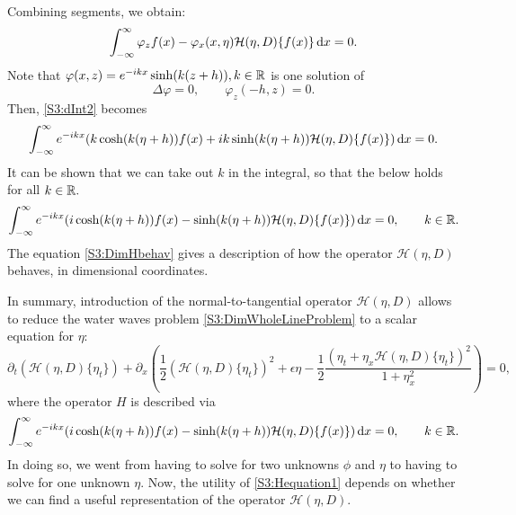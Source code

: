 \documentclass[11pt,reqno,oneside,a4paper]{article}
\begin{document}
Combining segments, we obtain: 
\begin{equation}\label{S3:dInt2}
\int_{-\infty}^{\infty} \varphi_z f(x) -\varphi_x(x, \eta) \mathcal{H}( \eta, D)\{ f(x) \} \,\mathrm{d} x = 0.
\end{equation}
Note that $\varphi(x,z) = e^{-ikx} \sinh(k(z+h)), k \in \mathbb R$ is one solution of 
\[ \Delta \varphi = 0, \qquad \varphi_z(-h,z) = 0.\]
Then, \eqref{S3:dInt2} becomes
\begin{align*}
\int_{-\infty}^{\infty} e^{-ikx}( k \cosh(k(\eta+h)) f(x) + ik \sinh(k(\eta+h)) \mathcal{H}( \eta, D)\{ f(x) \}) \,\mathrm{d} x = 0.
\end{align*}
It can be shown that we can take out $k$ in the integral, so that the below holds for all $k \in \mathbb R.$
\begin{equation}\label{S3:DimHbehav}
\int_{-\infty}^{\infty} e^{-ikx}( i  \cosh(k(\eta+h)) f(x) - \sinh(k(\eta+h)) \mathcal{H}( \eta, D)\{ f(x) \}) \,\mathrm{d} x = 0, \qquad k \in \mathbb R.
\end{equation}
The equation \eqref{S3:DimHbehav} gives a description of how the operator $\mathcal{H}( \eta, D)$ behaves, in dimensional coordinates. 

In summary, introduction of the normal-to-tangential operator $\mathcal{H}(\eta, D)$ allows to reduce the water waves problem \eqref{S3:DimWholeLineProblem} to a scalar equation for $\eta:$
\begin{equation}\label{S3:Hequation1}
\partial_t\left(\mathcal{H}(\eta, D)\{ \eta_t\} \right) + \partial_x\left( \frac{1}{2}\left(\mathcal{H}(\eta, D)\{\eta_t\} \right)^2 + \epsilon \eta - \frac{1}{2} \frac{(\eta_t + \eta_x \mathcal{H}(\eta, D)\{ \eta_t\})^2}{1+\eta_x^2}\right) = 0,
\end{equation}
where the operator $H$ is described via 
\begin{equation}\label{S3:DimHbehav1}
\int_{-\infty}^{\infty} e^{-ikx}( i  \cosh(k(\eta+h)) f(x) - \sinh(k(\eta+h)) \mathcal{H}( \eta, D)\{ f(x) \}) \,\mathrm{d} x = 0, \qquad k \in \mathbb R.
\end{equation}
In doing so, we went from having to solve for two unknowns $\phi$ and $\eta$ to having to solve for one unknown $\eta.$ Now, the utility of \eqref{S3:Hequation1} depends on whether we can find a useful representation of the operator $\mathcal{H}(\eta, D).$ 
\end{document}
